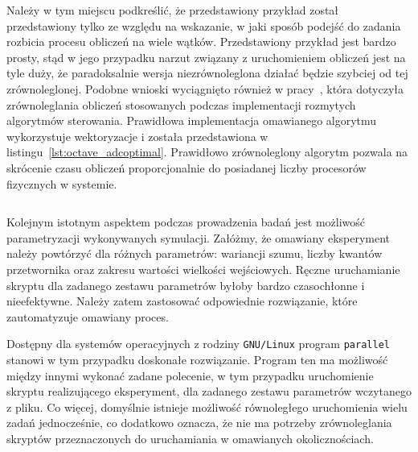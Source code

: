 \begin{listing}[hbt]
\inputminted{octave}{skrypty/get_adc_error.m}
\end{listing}

\begin{listing}[hbt]
\inputminted{octave}{skrypty/octave_adcparallel.m}
\end{listing}

Należy w tym miejscu podkreślić, że przedstawiony przykład został przedstawiony tylko ze względu na wskazanie, w jaki sposób podejść do zadania rozbicia procesu obliczeń na wiele wątków. Przedstawiony przykład jest bardzo prosty, stąd w jego przypadku narzut związany z uruchomieniem obliczeń jest na tyle duży, że paradoksalnie wersja niezrównoleglona działać będzie szybciej od tej zrównoleglonej. Podobne wnioski wyciągnięto również w pracy~\cite{auth_parallel}, która dotyczyła zrównoleglania obliczeń stosowanych podczas implementacji rozmytych algorytmów sterowania. Prawidłowa implementacja omawianego algorytmu wykorzystuje wektoryzacje i została przedstawiona w listingu~\ref{lst:octave_adcoptimal}. Prawidłowo zrównoleglony algorytm pozwala na skrócenie czasu obliczeń proporcjonalnie do posiadanej liczby procesorów fizycznych w systemie.

\begin{listing}[htb]
\inputminted{octave}{skrypty/octave_adcoptimal.m}
\end{listing}

Kolejnym istotnym aspektem podczas prowadzenia badań jest możliwość parametryzacji wykonywanych symulacji. Załóżmy, że omawiany eksperyment należy powtórzyć dla różnych parametrów: wariancji szumu, liczby kwantów przetwornika oraz zakresu wartości wielkości wejściowych. Ręczne uruchamianie skryptu dla zadanego zestawu parametrów byłoby bardzo czasochłonne i nieefektywne. Należy zatem zastosować odpowiednie rozwiązanie, które zautomatyzuje omawiany proces.

Dostępny dla systemów operacyjnych z rodziny \texttt{GNU/Linux} program \texttt{parallel} stanowi w tym przypadku doskonałe rozwiązanie. Program ten ma możliwość między innymi wykonać zadane polecenie, w tym przypadku uruchomienie skryptu realizującego eksperyment, dla zadanego zestawu parametrów wczytanego z pliku. Co więcej, domyślnie istnieje możliwość równoległego uruchomienia wielu zadań jednocześnie, co dodatkowo oznacza, że nie ma potrzeby zrównoleglania skryptów przeznaczonych do uruchamiania w omawianych okolicznościach.


